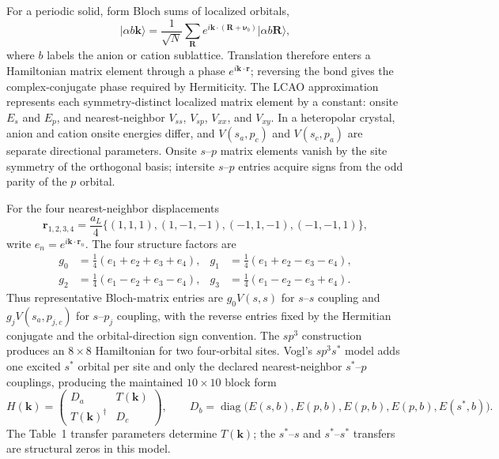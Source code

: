 \documentclass[11pt]{article}
\begin{document}
For a periodic solid, form Bloch sums of localized orbitals,
\begin{equation}
  \lvert \alpha b\mathbf{k}\rangle
  = \frac{1}{\sqrt{N}}\sum_{\mathbf{R}}
    e^{i\mathbf{k}\cdot(\mathbf{R}+\boldsymbol{\nu}_b)}
    \lvert \alpha b\mathbf{R}\rangle,
\end{equation}
where $b$ labels the anion or cation sublattice.  Translation therefore enters a
Hamiltonian matrix element through a phase $e^{i\mathbf{k}\cdot\mathbf{r}}$; reversing
the bond gives the complex-conjugate phase required by Hermiticity.  The LCAO
approximation represents each symmetry-distinct localized matrix element by a constant:
onsite $E_s$ and $E_p$, and nearest-neighbor $V_{ss}$, $V_{sp}$, $V_{xx}$, and
$V_{xy}$.  In a heteropolar crystal, anion and cation onsite energies differ, and
$V(s_a,p_c)$ and $V(s_c,p_a)$ are separate directional parameters.  Onsite $s$--$p$
matrix elements vanish by the site symmetry of the orthogonal basis; intersite $s$--$p$
entries acquire signs from the odd parity of the $p$ orbital.

For the four nearest-neighbor displacements
\begin{equation}
  \mathbf{r}_{1,2,3,4}
  = \frac{a_L}{4}
    \bigl\{(1,1,1),(1,-1,-1),(-1,1,-1),(-1,-1,1)\bigr\},
\end{equation}
write $e_n=e^{i\mathbf{k}\cdot\mathbf{r}_n}$.  The four structure factors are
\begin{align}
  g_0 &= \tfrac14(e_1+e_2+e_3+e_4), &
  g_1 &= \tfrac14(e_1+e_2-e_3-e_4), \\
  g_2 &= \tfrac14(e_1-e_2+e_3-e_4), &
  g_3 &= \tfrac14(e_1-e_2-e_3+e_4).
\end{align}
Thus representative Bloch-matrix entries are $g_0V(s,s)$ for $s$--$s$ coupling and
$g_jV(s_a,p_{j,c})$ for $s$--$p_j$ coupling, with the reverse entries fixed by the
Hermitian conjugate and the orbital-direction sign convention.  The $sp^3$ construction
produces an $8\times8$ Hamiltonian for two four-orbital sites.  Vogl's $sp^3s^*$ model
adds one excited $s^*$ orbital per site and only the declared nearest-neighbor
$s^*$--$p$ couplings, producing the maintained $10\times10$ block form
\begin{equation}
  H(\mathbf{k})=
  \begin{pmatrix}
    D_a & T(\mathbf{k}) \\
    T(\mathbf{k})^\dagger & D_c
  \end{pmatrix},
  \qquad
  D_b=\operatorname{diag}
  \bigl(E(s,b),E(p,b),E(p,b),E(p,b),E(s^*,b)\bigr).
\end{equation}
The Table~1 transfer parameters determine $T(\mathbf{k})$; the $s^*$--$s$ and
$s^*$--$s^*$ transfers are structural zeros in this model.



\end{document}
